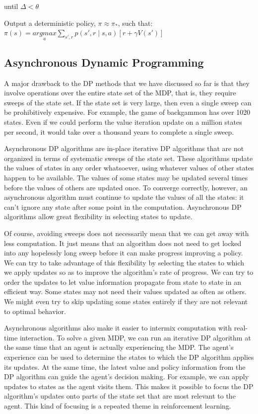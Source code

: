 \documentclass{article}
\begin{document}
until \(\Delta < \theta\)

Output a deterministic policy, \(\pi \approx \pi_*\), such that: \(\pi(s) = \underset{a}{argmax} \sum_{s', r} p(s', r \mid s, a) [r + \gamma V(s')]\)

\subsection{Asynchronous Dynamic Programming}

A major drawback to the DP methods that we have discussed so far is that they involve operations over the entire state set of the MDP, that is, they require sweeps of the state set. 
If the state set is very large, then even a single sweep can be prohibitively expensive. For example, the game of backgammon has over 1020 states. Even if we could perform the value iteration update on a million states per second, 
it would take over a thousand years to complete a single sweep.

Asynchronous DP algorithms are in-place iterative DP algorithms that are not organized in terms of systematic sweeps of the state set. These algorithms update the values of states in any order whatsoever, 
using whatever values of other states happen to be available. The values of some states may be updated several times before the values of others are updated once. 
To converge correctly, however, an asynchronous algorithm must continue to update the values of all the states: it can't ignore any state after some point in the computation. 
Asynchronous DP algorithms allow great flexibility in selecting states to update.

Of course, avoiding sweeps does not necessarily mean that we can get away with less computation. It just means that an algorithm does not need to get locked into any hopelessly long sweep before it can make progress improving a policy. 
We can try to take advantage of this flexibility by selecting the states to which we apply updates so as to improve the algorithm's rate of progress. We can try to order the updates to let value information propagate from state to state in an efficient way. 
Some states may not need their values updated as often as others. We might even try to skip updating some states entirely if they are not relevant to optimal behavior.

Asynchronous algorithms also make it easier to intermix computation with real-time interaction. To solve a given MDP, we can run an iterative DP algorithm at the same time that an agent is actually experiencing the MDP. 
The agent's experience can be used to determine the states to which the DP algorithm applies its updates. At the same time, the latest value and policy information from the DP algorithm can guide the agent's decision making. 
For example, we can apply updates to states as the agent visits them. This makes it possible to focus the DP algorithm's updates onto parts of the state set that are most relevant to the agent. This kind of focusing is a repeated theme in reinforcement learning.
\end{document}
